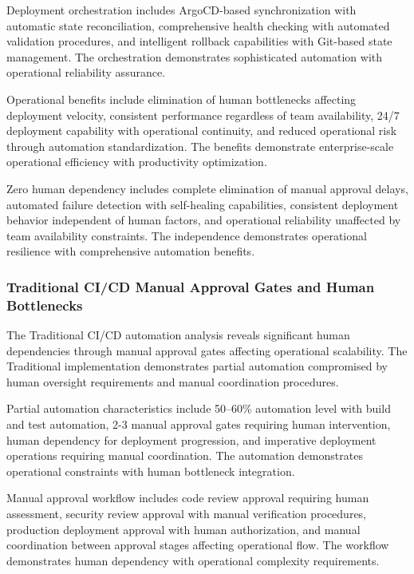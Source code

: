 Deployment orchestration includes ArgoCD-based synchronization with automatic state reconciliation, comprehensive health checking with automated validation procedures, and intelligent rollback capabilities with Git-based state management. The orchestration demonstrates sophisticated automation with operational reliability assurance.

Operational benefits include elimination of human bottlenecks affecting deployment velocity, consistent performance regardless of team availability, 24/7 deployment capability with operational continuity, and reduced operational risk through automation standardization. The benefits demonstrate enterprise-scale operational efficiency with productivity optimization.

Zero human dependency includes complete elimination of manual approval delays, automated failure detection with self-healing capabilities, consistent deployment behavior independent of human factors, and operational reliability unaffected by team availability constraints. The independence demonstrates operational resilience with comprehensive automation benefits.

\subsubsection{Traditional CI/CD Manual Approval Gates and Human Bottlenecks}

The Traditional CI/CD automation analysis reveals significant human dependencies through manual approval gates affecting operational scalability. The Traditional implementation demonstrates partial automation compromised by human oversight requirements and manual coordination procedures.

Partial automation characteristics include 50--60\% automation level with build and test automation, 2-3 manual approval gates requiring human intervention, human dependency for deployment progression, and imperative deployment operations requiring manual coordination. The automation demonstrates operational constraints with human bottleneck integration.

Manual approval workflow includes code review approval requiring human assessment, security review approval with manual verification procedures, production deployment approval with human authorization, and manual coordination between approval stages affecting operational flow. The workflow demonstrates human dependency with operational complexity requirements.

